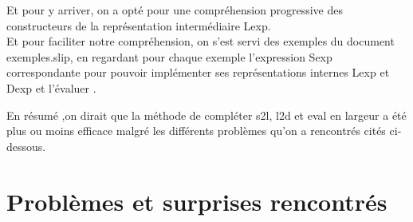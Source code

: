\documentclass{article}
\begin{document}
Et pour y arriver, on a opté pour une compréhension progressive des constructeurs de la représentation intermédiaire Lexp.\\

Et pour faciliter notre compréhension, on s’est servi des exemples du document exemples.slip, en regardant pour chaque exemple l'expression Sexp correspondante pour  pouvoir implémenter ses représentations internes Lexp et Dexp  et l’évaluer .

En résumé ,on dirait que la méthode de compléter s2l, l2d et eval en largeur a été plus ou moins efficace malgré les différents problèmes qu’on a rencontrés cités ci- dessous.


\newpage
\section{Problèmes et surprises rencontrés}
\end{document}
